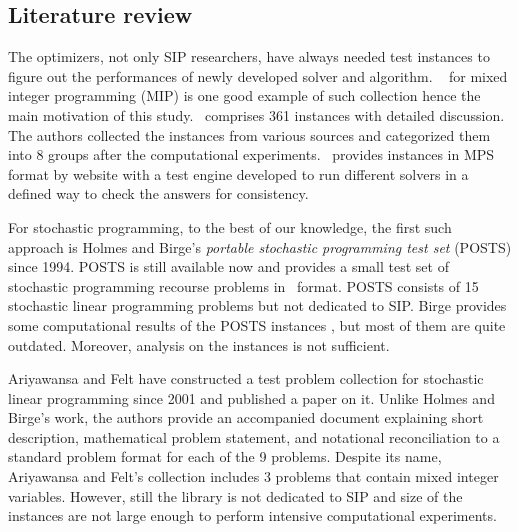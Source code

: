\subsection{Literature review} \label{subsec:literaturereview}
The optimizers, not only SIP researchers, have always needed test instances to figure out the performances of newly developed solver and algorithm. \miplib\ \cite{MIPLIB} for mixed integer programming (MIP) is one good example of such collection hence the main motivation of this study. \miplib\ comprises 361 instances with detailed discussion. The authors collected the instances from various sources and categorized them into 8 groups after the computational experiments. \miplib\ provides instances in \textsf{MPS} format by website with a test engine developed to run different solvers in a defined way to check the answers for consistency. 

For stochastic programming, to the best of our knowledge, the first such approach is Holmes and Birge's \textit{portable stochastic programming test set} (POSTS) \cite{POSTS} since 1994. POSTS is still available now and provides a small test set of stochastic programming recourse problems in \smps\ format. POSTS consists of 15 stochastic linear programming problems but not dedicated to SIP. Birge provides some computational results of the POSTS instances \cite{POSTSresults}, but most of them are quite outdated. Moreover, analysis on the instances is not sufficient. 

Ariyawansa and Felt \cite{AF2004} have constructed a test problem collection for stochastic linear programming since 2001 and published a paper on it. Unlike Holmes and Birge's work, the authors provide an accompanied document explaining short description, mathematical problem statement, and notational reconciliation to a standard problem format for each of the 9 problems. Despite its name, Ariyawansa and Felt's collection includes 3 problems that contain mixed integer variables. However, still the library is not dedicated to SIP and size of the instances are not large enough to perform intensive computational experiments. 

